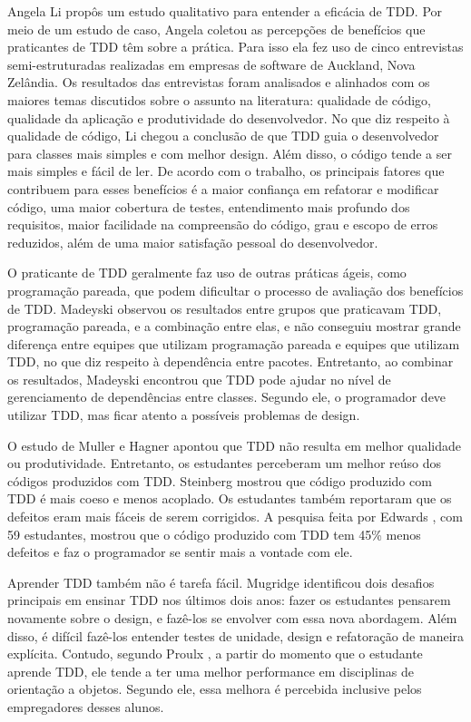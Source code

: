 Angela Li \cite{angela-li} propôs um estudo qualitativo para
entender a eficácia de TDD. Por meio de um estudo de caso, Angela coletou as 
percepções de benefícios que praticantes de TDD têm sobre a prática. Para isso ela
fez uso de cinco entrevistas semi-estruturadas realizadas em empresas de software de 
Auckland, Nova Zelândia. Os resultados das entrevistas foram analisados e alinhados
com os maiores temas discutidos sobre o assunto na literatura: qualidade de código,
qualidade da aplicação e produtividade do desenvolvedor.
No que diz respeito à qualidade de código, Li chegou a conclusão de
que TDD guia o desenvolvedor para classes mais simples e com melhor design. 
Além disso, o código tende a ser mais simples e fácil de ler.
De acordo com o trabalho, os principais fatores que contribuem para esses benefícios
é a maior confiança em refatorar e modificar código, uma maior cobertura de testes,
entendimento mais profundo dos requisitos, maior facilidade na compreensão do código,
grau e escopo de erros reduzidos, além de uma maior satisfação pessoal do desenvolvedor.

O praticante de TDD geralmente faz uso de outras práticas ágeis, como
programação pareada, que podem dificultar o processo de avaliação dos benefícios
de TDD. Madeyski \cite{madeyski-package-dependencies} observou os resultados
entre grupos que praticavam TDD, programação pareada, e a combinação entre elas,
e não conseguiu mostrar grande diferença entre equipes que utilizam programação 
pareada e equipes que utilizam TDD, no que diz respeito à dependência entre 
pacotes. Entretanto, ao combinar os resultados, Madeyski encontrou que TDD pode 
ajudar no nível de gerenciamento de dependências entre classes. Segundo ele, o 
programador deve utilizar TDD, mas ficar atento a possíveis problemas de design.

O estudo de Muller e Hagner \cite{muller-e-hagner} apontou que TDD não resulta
em melhor qualidade ou produtividade. Entretanto, os estudantes perceberam um 
melhor reúso dos códigos produzidos com TDD. Steinberg \cite{steinberg} mostrou
que código produzido com TDD é mais coeso e menos acoplado. Os estudantes também
reportaram que os defeitos eram mais fáceis de serem corrigidos. A pesquisa feita
por Edwards \cite{edwards}, com 59 estudantes, mostrou que o código produzido com
TDD tem 45\% menos defeitos e faz o programador se sentir mais a vontade
com ele.

Aprender TDD também não é tarefa fácil. Mugridge \cite{mugridge} identificou
dois desafios principais em ensinar TDD nos últimos dois anos: fazer os estudantes
pensarem novamente sobre o design, e fazê-los se envolver com essa nova
abordagem. Além disso, é difícil fazê-los entender testes de unidade, design e refatoração
de maneira explícita. Contudo, segundo Proulx \cite{proulx}, a partir do momento que
o estudante aprende TDD, ele tende a ter uma melhor performance em disciplinas
de orientação a objetos. Segundo ele, essa melhora é percebida inclusive pelos
empregadores desses alunos. 

